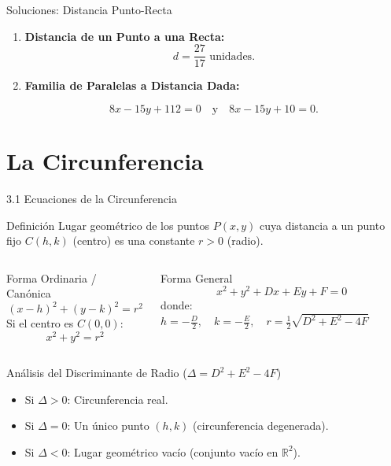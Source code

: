 \documentclass[10pt,aspectratio=169,spanish]{beamer}
\begin{document}
\begin{frame}{Soluciones: Distancia Punto-Recta}
\begin{enumerate}
    \item \textbf{Distancia de un Punto a una Recta:}
    \[
   \boxed{d = \frac{27}{17}\text{ unidades}}.
    \]

    \item \textbf{Familia de Paralelas a Distancia Dada:}

    \[
    \boxed{8x - 15y + 112 = 0} \quad \text{y} \quad \boxed{8x - 15y + 10 = 0}.
    \]
\end{enumerate}
\end{frame}

\section{La Circunferencia}

\begin{frame}{3.1 Ecuaciones de la Circunferencia}
\begin{block}{Definición}
Lugar geométrico de los puntos $P(x,y)$ cuya distancia a un punto fijo $C(h,k)$ (centro) es una constante $r > 0$ (radio).
\end{block}

\begin{columns}
  \begin{block}{Forma Ordinaria / Canónica}
  \[ (x - h)^2 + (y - k)^2 = r^2 \]
  Si el centro es $C(0,0)$:
  \[ x^2 + y^2 = r^2 \]
  \end{block}

  \begin{block}{Forma General}
  \[ x^2 + y^2 + Dx + Ey + F = 0 \]
  donde:
  $h = -\frac{D}{2}, \quad k = -\frac{E}{2}, \quad r = \frac{1}{2}\sqrt{D^2 + E^2 - 4F}$
  \end{block}
\end{columns}

\pause
\begin{alertblock}{Análisis del Discriminante de Radio ($\Delta = D^2 + E^2 - 4F$)}
\begin{itemize}
  \item Si $\Delta > 0$: Circunferencia real.
  \item Si $\Delta = 0$: Un único punto $(h,k)$ (circunferencia degenerada).
  \item Si $\Delta < 0$: Lugar geométrico vacío (conjunto vacío en $\mathbb{R}^2$).
\end{itemize}
\end{alertblock}
\end{frame}
\end{document}
